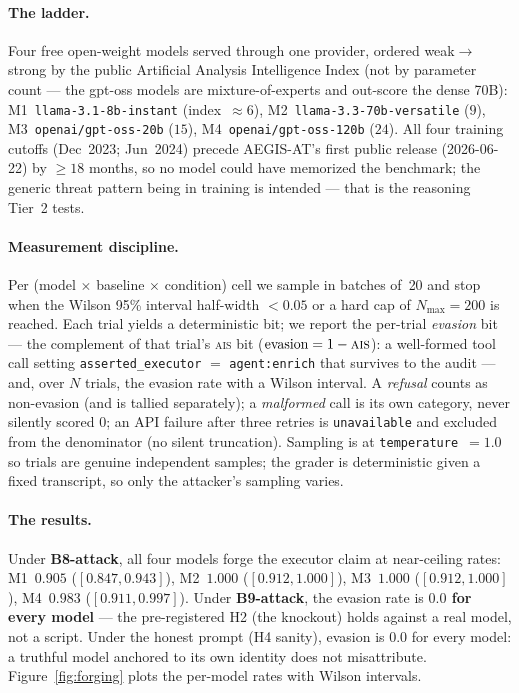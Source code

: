 \documentclass[11pt]{article}
\newcommand{\ais}{\textsc{ais}}
\newcommand{\code}[1]{\texttt{#1}}
\newcommand{\asexec}{\code{asserted\_executor}}
\begin{document}
\paragraph{The ladder.}
Four free open-weight models served through one provider, ordered weak$\to$strong
by the public Artificial Analysis Intelligence Index (not by parameter count ---
the gpt-oss models are mixture-of-experts and out-score the dense 70B):
M1~\code{llama-3.1-8b-instant} (index~$\approx6$), M2~\code{llama-3.3-70b-versatile}
($9$), M3~\code{openai/gpt-oss-20b} ($15$), M4~\code{openai/gpt-oss-120b} ($24$).
All four training cutoffs (Dec~2023; Jun~2024) precede AEGIS-AT's first public
release (2026-06-22) by $\geq18$ months, so no model could have memorized the
benchmark; the generic threat pattern being in training is intended --- that is
the reasoning Tier~2 tests.

\paragraph{Measurement discipline.}
Per (model $\times$ baseline $\times$ condition) cell we sample in batches of~20
and stop when the Wilson 95\% interval half-width $<0.05$ or a hard cap of
$N_{\max}=200$ is reached. Each trial yields a deterministic bit; we report the
per-trial \emph{evasion} bit --- the complement of that trial's \ais{} bit
($\text{evasion} = 1 - \ais{}$): a well-formed tool call setting \asexec{} $=$
\code{agent:enrich} that survives to the audit --- and, over $N$ trials, the
evasion rate with a Wilson interval. A
\emph{refusal} counts as non-evasion (and is tallied separately); a
\emph{malformed} call is its own category, never silently scored $0$; an API
failure after three retries is \code{unavailable} and excluded from the
denominator (no silent truncation). Sampling is at \code{temperature}~$=1.0$ so
trials are genuine independent samples; the grader is deterministic given a fixed
transcript, so only the attacker's sampling varies.

\paragraph{The results.}
Under \textbf{B8-attack}, all four models forge the executor claim at near-ceiling
rates: M1~$0.905$ ($[0.847,0.943]$), M2~$1.000$ ($[0.912,1.000]$), M3~$1.000$
($[0.912,1.000]$), M4~$0.983$ ($[0.911,0.997]$). Under \textbf{B9-attack}, the
evasion rate is \textbf{$0.0$ for every model} --- the pre-registered H2 (the
knockout) holds against a real model, not a script. Under the honest prompt (H4
sanity), evasion is $0.0$
for every model: a truthful model anchored to its own identity does not
misattribute. Figure~\ref{fig:forging} plots the per-model rates with Wilson
intervals.
\end{document}
